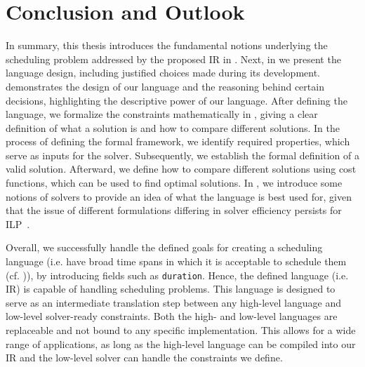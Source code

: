 \cleardoubleoddpage%
\chapter{Conclusion and Outlook}
\label{chapter:conclusion}
In summary, this thesis introduces the fundamental notions underlying the scheduling problem addressed by the proposed \ac{IR} in . Next, in  we present the language design, including justified choices made during its development.  demonstrates the design of our language and the reasoning behind certain decisions, highlighting the descriptive power of our language. After defining the language, we formalize the constraints mathematically in , giving a clear definition of what a solution is and how to compare different solutions. In the process of defining the formal framework, we identify required properties, which serve as inputs for the solver. Subsequently, we establish the formal definition of a valid solution. Afterward, we define how to compare different solutions using cost functions, which can be used to find optimal solutions. In , we introduce some notions of solvers to provide an idea of what the language is best used for, given that the issue of different formulations differing in solver efficiency persists for \ac{ILP}~\cite{bib:1994-chaudhuri}.

Overall, we successfully handle the defined goals for creating a scheduling language (i.e. have broad time spans in which it is acceptable to schedule them (cf. )), by introducing fields such as \texttt{duration}. Hence, the defined language (i.e. \ac{IR}) is capable of handling scheduling problems. This language is designed to serve as an intermediate translation step between any high-level language and low-level solver-ready constraints. Both the high- and low-level languages are replaceable and not bound to any specific implementation. This allows for a wide range of applications, as long as the high-level language can be compiled into our \Ac{IR} and the low-level solver can handle the constraints we define.


